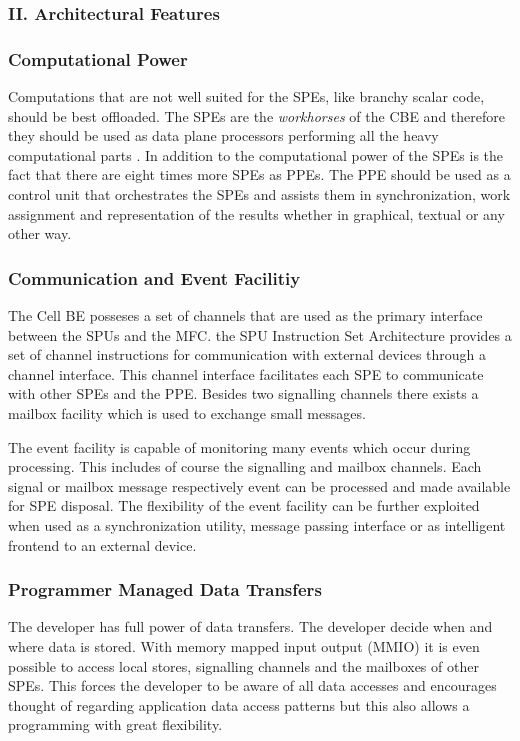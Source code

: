 \documentclass[DIV10, abstracton, openright, footsepline, headsepline, twoside, 9pt,
bigheadings]{scrreprt}
\begin{document}
\subsubsection*{II. Architectural Features}
\label{sec:arch_feat}

\subsubsection*{Computational Power}
Computations that are not well suited for the SPEs, like branchy scalar code,
should be best offloaded. The SPEs are the \textit{workhorses} of the CBE and
therefore they should be used as data plane processors performing all the
heavy computational parts \cite{Brokenshire06}. In addition to the computational
power of the
SPEs is the fact that there are eight times more SPEs as PPEs. The PPE should be
used as a control unit that orchestrates the SPEs and assists them in
synchronization, work assignment and representation of the results whether in
graphical, textual or any other way.


\subsubsection*{Communication and Event Facilitiy}
The Cell BE posseses a set of channels that are used as the primary interface
between the SPUs and the MFC. the SPU Instruction Set Architecture provides a
set of channel instructions for communication with external devices through a
channel interface. This channel interface facilitates each SPE to communicate
with other SPEs and the PPE. Besides two signalling channels there exists a
mailbox facility which is used to exchange small messages.

The event facility is capable of monitoring many events which occur during
processing. This includes of course the signalling and mailbox channels.
Each signal or mailbox message respectively event can be processed and made available
for SPE disposal. The flexibility of the event facility can be further exploited when
used as a synchronization utility,  message passing interface or as intelligent
frontend to an external device.

\subsubsection*{Programmer Managed Data Transfers}
The developer has full power of data transfers. The developer decide when and where data
is stored.  With memory mapped input output (MMIO) it is even possible to access local
stores, signalling channels and the mailboxes of other SPEs. This forces the developer
to be aware of all data accesses and encourages thought of regarding application data
access patterns but this also allows a programming with great flexibility.
\end{document}
